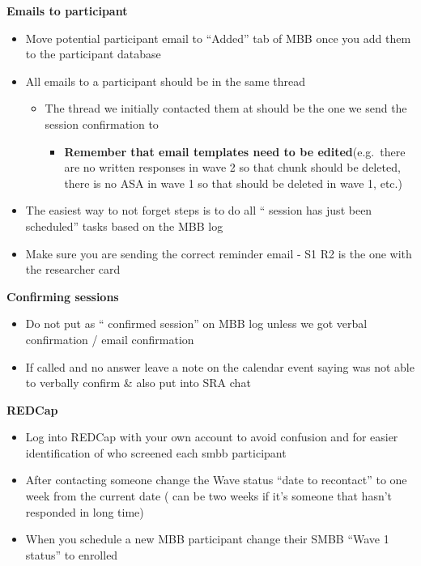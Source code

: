 \documentclass[
]{book}
\providecommand{\tightlist}{%
  \setlength{\itemsep}{0pt}\setlength{\parskip}{0pt}}
\begin{document}
\textbf{Emails to participant}

\begin{itemize}
\tightlist
\item
  Move potential participant email to ``Added'' tab of MBB once you add them to the participant database
\item
  All emails to a participant should be in the same thread

  \begin{itemize}
  \tightlist
  \item
    The thread we initially contacted them at should be the one we send the session confirmation to

    \begin{itemize}
    \tightlist
    \item
      \textbf{Remember that email templates need to be edited}(e.g.~there are no written responses in wave 2 so that chunk should be deleted, there is no ASA in wave 1 so that should be deleted in wave 1, etc.)
    \end{itemize}
  \end{itemize}
\item
  The easiest way to not forget steps is to do all `` session has just been scheduled'' tasks based on the MBB log
\item
  Make sure you are sending the correct reminder email - S1 R2 is the one with the researcher card
\end{itemize}

\textbf{Confirming sessions}

\begin{itemize}
\tightlist
\item
  Do not put as `` confirmed session'' on MBB log unless we got verbal confirmation / email confirmation
\item
  If called and no answer leave a note on the calendar event saying was not able to verbally confirm \& also put into SRA chat
\end{itemize}

\textbf{REDCap}

\begin{itemize}
\tightlist
\item
  Log into REDCap with your own account to avoid confusion and for easier identification of who screened each smbb participant
\item
  After contacting someone change the Wave status ``date to recontact'' to one week from the current date ( can be two weeks if it's someone that hasn't responded in long time)
\item
  When you schedule a new MBB participant change their SMBB ``Wave 1 status'' to enrolled
\end{itemize}
\end{document}
